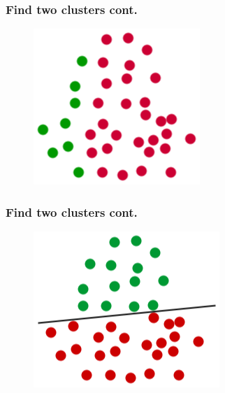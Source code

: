 \documentclass{beamer}
\begin{document}
  \begin{frame}
    \frametitle{Find two clusters cont.} 
    \begin{figure}
      \includegraphics[scale=.5]{graphics/presentation/clusters2c} 
    \end{figure}
  \end{frame}

  \begin{frame}
    \frametitle{Find two clusters cont.} 
    \begin{figure}
      \includegraphics[scale=.5]{graphics/presentation/clusters2d} 
    \end{figure}
  \end{frame}
\end{document}
